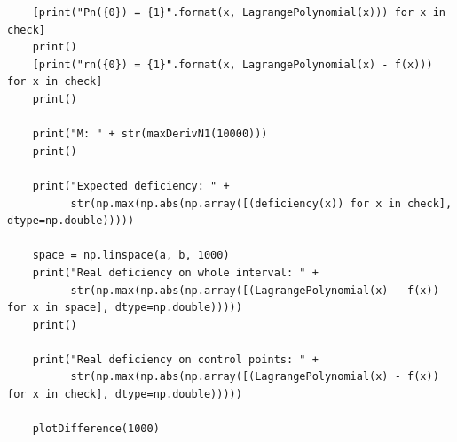 \documentclass[14pt, a4paper]{article}
\begin{document}
\begin{lstlisting}
    [print("Pn({0}) = {1}".format(x, LagrangePolynomial(x))) for x in check]
    print()
    [print("rn({0}) = {1}".format(x, LagrangePolynomial(x) - f(x))) for x in check]
    print()

    print("M: " + str(maxDerivN1(10000)))
    print()
    
    print("Expected deficiency: " + 
          str(np.max(np.abs(np.array([(deficiency(x)) for x in check], dtype=np.double)))))
    
    space = np.linspace(a, b, 1000)
    print("Real deficiency on whole interval: " + 
          str(np.max(np.abs(np.array([(LagrangePolynomial(x) - f(x)) for x in space], dtype=np.double)))))
    print()
    
    print("Real deficiency on control points: " + 
          str(np.max(np.abs(np.array([(LagrangePolynomial(x) - f(x)) for x in check], dtype=np.double)))))
    
    plotDifference(1000)
\end{lstlisting}
\end{document}

